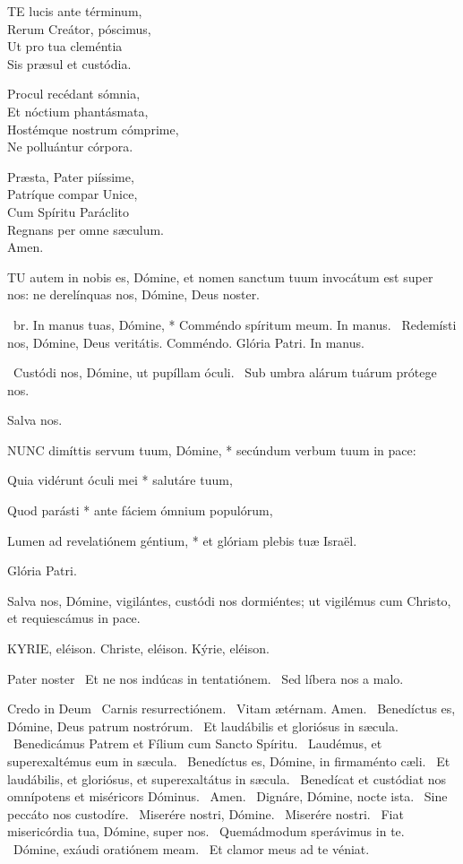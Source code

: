 
\lettrine[lines=2]{T}{E} lucis ante términum,\\
Rerum Creátor, póscimus,\\
Ut pro tua cleméntia\\
Sis præsul et custódia.

Procul recédant sómnia,\\
Et nóctium phantásmata,\\
Hostémque nostrum cómprime,\\
Ne polluántur córpora.

Præsta, Pater piíssime,\\
Patríque compar Unice,\\
Cum Spíritu Paráclito\\
Regnans per omne sæculum.\\
Amen.


\lettrine[lines=2]{T}{U} autem in nobis es, Dómine, et nomen sanctum tuum invocátum est super nos: ne derelínquas nos, Dómine, Deus noster.

\R\ br. In manus tuas, Dómine, * Comméndo spíritum meum. In manus. \V\ Redemísti nos, Dómine, Deus veritátis. Comméndo. Glória Patri. In manus.

\V\ Custódi nos, Dómine, ut pupíllam óculi. \R\ Sub umbra alárum tuárum prótege nos.

 Salva nos.


\lettrine[lines=2]{N}{UNC} dimíttis servum tuum, Dómine, * secúndum verbum tuum in pace:

Quia vidérunt óculi mei * salutáre tuum,

Quod parásti * ante fáciem ómnium populórum,

Lumen ad revelatiónem géntium, * et glóriam plebis tuæ Israël.

Glória Patri.

 Salva nos, Dómine, vigilántes, custódi nos dormiéntes; ut vigilémus cum Christo, et requiescámus in pace.


KYRIE, eléison. Christe, eléison. Kýrie, eléison.

Pater noster  \V\ Et ne nos indúcas in tentatiónem. \R\ Sed líbera nos a malo.

Credo in Deum  \V\ Carnis resurrectiónem. \R\ Vitam ætérnam. Amen. \V\ Benedíctus es, Dómine, Deus patrum nostrórum. \R\ Et laudábilis et gloriósus in sæcula. \V\ Benedicámus Patrem et Fílium cum Sancto Spíritu. \R\ Laudémus, et superexaltémus eum in sæcula. \V\ Benedíctus es, Dómine, in firmaménto cæli. \R\ Et laudábilis, et gloriósus, et superexaltátus in sæcula. \V\ Benedícat et custódiat nos omnípotens et miséricors Dóminus. \R\ Amen. \V\ Dignáre, Dómine, nocte ista. \R\ Sine peccáto nos custodíre. \V\ Miserére nostri, Dómine. \R\ Miserére nostri. \V\ Fiat misericórdia tua, Dómine, super nos. \R\ Quemádmodum sperávimus in te. \V\ Dómine, exáudi oratiónem meam. \R\ Et clamor meus ad te véniat.

